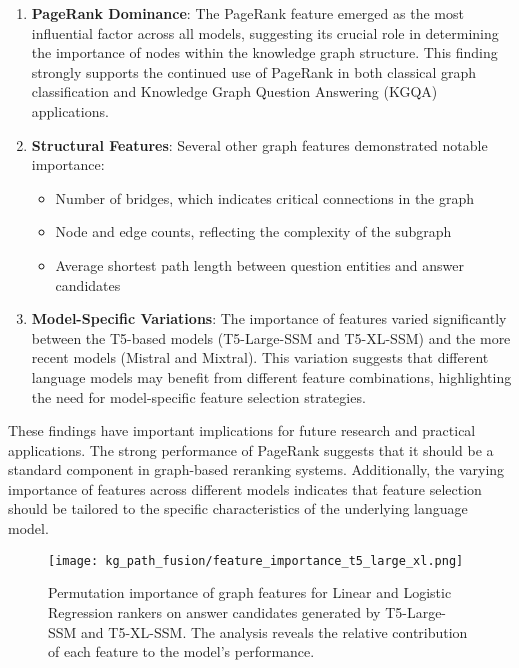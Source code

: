\begin{enumerate}
    \item \textbf{PageRank Dominance}: The PageRank feature emerged as the most influential factor across all models, suggesting its crucial role in determining the importance of nodes within the knowledge graph structure. This finding strongly supports the continued use of PageRank in both classical graph classification and Knowledge Graph Question Answering (KGQA) applications.
    
    \item \textbf{Structural Features}: Several other graph features demonstrated notable importance:
    \begin{itemize}
        \item Number of bridges, which indicates critical connections in the graph
        \item Node and edge counts, reflecting the complexity of the subgraph
        \item Average shortest path length between question entities and answer candidates
    \end{itemize}
    
    \item \textbf{Model-Specific Variations}: The importance of features varied significantly between the T5-based models (T5-Large-SSM and T5-XL-SSM) and the more recent models (Mistral and Mixtral). This variation suggests that different language models may benefit from different feature combinations, highlighting the need for model-specific feature selection strategies.
\end{enumerate}

These findings have important implications for future research and practical applications. The strong performance of PageRank suggests that it should be a standard component in graph-based reranking systems. Additionally, the varying importance of features across different models indicates that feature selection should be tailored to the specific characteristics of the underlying language model.

\begin{figure}[htb]
   \centering
   \texttt{[image: kg\_path\_fusion/feature\_importance\_t5\_large\_xl.png]}
   \caption{Permutation importance of graph features for Linear and Logistic Regression rankers on answer candidates generated by T5-Large-SSM and T5-XL-SSM. The analysis reveals the relative contribution of each feature to the model's performance.}
   \label{fig:controllable_fusion:feature_importance_t5_large_xl}
\end{figure}

